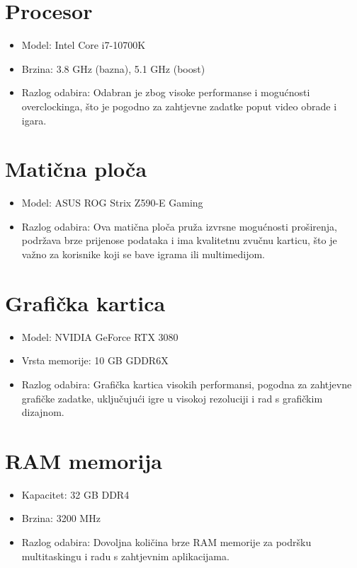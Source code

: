 \documentclass{article}
\begin{document}
\section{Procesor}
\begin{itemize}[label=--]
  \item Model: Intel Core i7-10700K
  \item Brzina: 3.8 GHz (bazna), 5.1 GHz (boost)
  \item Razlog odabira: Odabran je zbog visoke performanse i mogućnosti overclockinga, što je pogodno za zahtjevne zadatke poput video obrade i igara.
\end{itemize}

\section{Matična ploča}
\begin{itemize}[label=--]
  \item Model: ASUS ROG Strix Z590-E Gaming
  \item Razlog odabira: Ova matična ploča pruža izvrsne mogućnosti proširenja, podržava brze prijenose podataka i ima kvalitetnu zvučnu karticu, što je važno za korisnike koji se bave igrama ili multimedijom.
\end{itemize}

\section{Grafička kartica}
\begin{itemize}[label=--]
  \item Model: NVIDIA GeForce RTX 3080
  \item Vrsta memorije: 10 GB GDDR6X
  \item Razlog odabira: Grafička kartica visokih performansi, pogodna za zahtjevne grafičke zadatke, uključujući igre u visokoj rezoluciji i rad s grafičkim dizajnom.
\end{itemize}

\section{RAM memorija}
\begin{itemize}[label=--]
  \item Kapacitet: 32 GB DDR4
  \item Brzina: 3200 MHz
  \item Razlog odabira: Dovoljna količina brze RAM memorije za podršku multitaskingu i radu s zahtjevnim aplikacijama.
\end{itemize}
\end{document}
